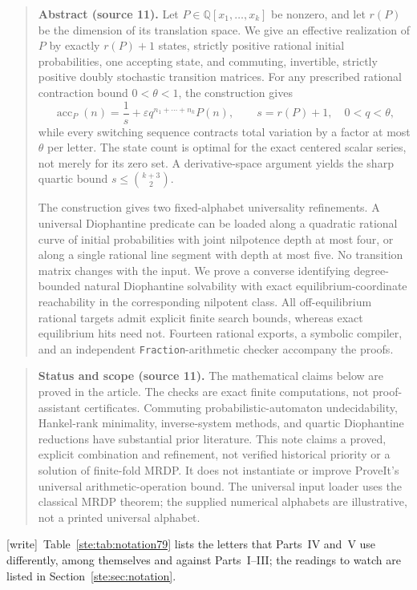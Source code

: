 \documentclass[11pt,letterpaper]{article}
\theoremstyle{definition}
\theoremstyle{remark}
\newcommand{\Q}{\mathbb Q}
\newcommand{\acc}{\operatorname{acc}}
\newcommand{\wtag}{\textup{[write]}}
\begin{document}
\begin{quote}\small
\textbf{Abstract (source 11).} Let $P\in\Q[x_1,\ldots,x_k]$ be nonzero, and let $r(P)$ be the dimension of
its translation space. We give an effective realization of $P$ by exactly
$r(P)+1$ states, strictly positive rational initial probabilities, one accepting
state, and commuting, invertible, strictly positive doubly stochastic transition
matrices. For any prescribed rational contraction bound $0<\theta<1$, the
construction gives
\[
 \acc_P(n)=\frac1s+\varepsilon q^{n_1+\cdots+n_k}P(n),
 \qquad s=r(P)+1,\quad 0<q<\theta,
\]
while every switching sequence contracts total variation by a factor at most
$\theta$ per letter. The state count is optimal for the exact centered scalar
series, not merely for its zero set. A derivative-space argument yields the
sharp quartic bound $s\leq\binom{k+3}{2}$.

The construction gives two fixed-alphabet universality refinements. A universal
Diophantine predicate can be loaded along a quadratic rational curve of initial
probabilities with joint nilpotence depth at most four, or along a single
rational line segment with depth at most five. No transition matrix changes
with the input. We prove a converse identifying degree-bounded natural
Diophantine solvability with exact equilibrium-coordinate reachability in the
corresponding nilpotent class. All off-equilibrium rational targets admit
explicit finite search bounds, whereas exact equilibrium hits need not.
Fourteen rational exports, a symbolic compiler, and an independent
\texttt{Fraction}-arithmetic checker accompany the proofs.
\end{quote}
\begin{quote}\small
\textbf{Status and scope (source 11).} The mathematical claims below are proved in the
article. The checks are exact finite computations, not proof-assistant
certificates. Commuting probabilistic-automaton undecidability, Hankel-rank
minimality, inverse-system methods, and quartic Diophantine reductions have
substantial prior literature. This note claims a proved, explicit combination
and refinement, not verified historical priority or a solution of finite-fold
MRDP. It does not instantiate or improve ProveIt's universal arithmetic-operation
bound. The universal input loader uses the classical MRDP theorem; the supplied
numerical alphabets are illustrative, not a printed universal alphabet.
\end{quote}

\noindent\wtag\ Table~\ref{ste:tab:notation79} lists the letters that Parts~IV and~V use differently, among themselves and against Parts~I--III; the readings to watch are listed in Section~\ref{ste:sec:notation}.
\end{document}

